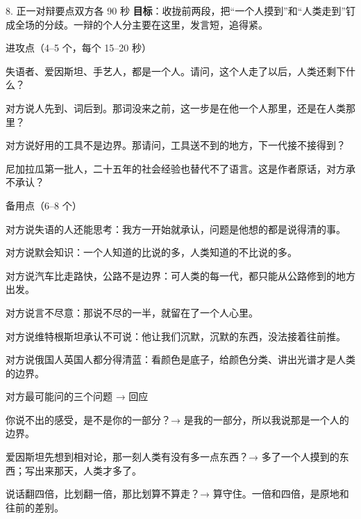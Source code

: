 \documentclass[script,pro]{debate}
\begin{document}
\begin{stage}{8. 正一对辩要点}{双方各 90 秒}
\textbf{目标}：收拢前两段，把“一个人摸到”和“人类走到”钉成全场的分歧。一辩的个人分主要在这里，发言短，追得紧。
\begin{points}{进攻点（4–5 个，每个 15–20 秒）}
\item 失语者、爱因斯坦、手艺人，都是一个人。请问，这个人走了以后，人类还剩下什么？
\item 对方说人先到、词后到。那词没来之前，这一步是在他一个人那里，还是在人类那里？
\item 对方说好用的工具不是边界。那请问，工具送不到的地方，下一代接不接得到？
\item 尼加拉瓜第一批人，二十五年的社会经验也替代不了语言。这是作者原话，对方承不承认？
\end{points}
\begin{points}{备用点（6–8 个）}
\item 对方说失语的人还能思考：我方一开始就承认，问题是他想的都是说得清的事。
\item 对方说默会知识：一个人知道的比说的多，人类知道的不比说的多。
\item 对方说汽车比走路快，公路不是边界：可人类的每一代，都只能从公路修到的地方出发。
\item 对方说言不尽意：那说不尽的一半，就留在了一个人心里。
\item 对方说维特根斯坦承认不可说：他让我们沉默，沉默的东西，没法接着往前推。
\item 对方说俄国人英国人都分得清蓝：看颜色是底子，给颜色分类、讲出光谱才是人类的边界。
\end{points}
\begin{points}{对方最可能问的三个问题 → 回应}
\item 你说不出的感受，是不是你的一部分？→ 是我的一部分，所以我说那是一个人的边界。
\item 爱因斯坦先想到相对论，那一刻人类有没有多一点东西？→ 多了一个人摸到的东西；写出来那天，人类才多了。
\item 说话翻四倍，比划翻一倍，那比划算不算走？→ 算守住。一倍和四倍，是原地和往前的差别。
\end{points}
\end{stage}
\end{document}
